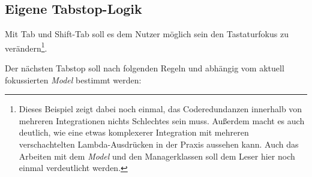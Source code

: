 \subsection{Eigene Tabstop-Logik}

Mit Tab und Shift-Tab soll es dem Nutzer möglich sein den Tastaturfokus zu
verändern\footnote{Dieses Beispiel zeigt dabei noch einmal, das Coderedundanzen innerhalb
von mehreren Integrationen nichts Schlechtes sein muss.
Außerdem macht es auch deutlich, wie eine etwas komplexerer Integration mit
mehreren verschachtelten Lambda-Ausdrücken in der Praxis aussehen kann. Auch das Arbeiten mit dem \textit{Model} und den Managerklassen soll dem Leser hier noch einmal verdeutlicht werden.}.



Der nächsten Tabstop soll nach folgenden Regeln und abhängig vom aktuell
fokussierten \textit{Model} bestimmt werden:

